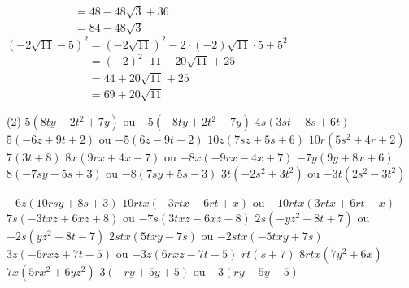 \documentclass[a4paper,12pt]{report}
\begin{document}
\begin{core}
\begin{tasks}
                    $\phantom{\left(4 \sqrt{3} -6\right)^{2}}=48-48\sqrt{3}+36$\\$\phantom{\left(4 \sqrt{3} -6\right)^{2}}={{84-48\sqrt{3}}}$
\task $\left(-2 \sqrt{11} -5\right)^{2}=\left(-2 \sqrt{11} \right)^{2}-2\cdot (-2)\sqrt{11}\cdot 5+5^{2}$\\
                    $\phantom{\left(-2 \sqrt{11} -5\right)^{2}}=(-2)^{2}\cdot 11 +20\sqrt{11}+ 25$\\
                    $\phantom{\left(-2 \sqrt{11} -5\right)^{2}}=44+20\sqrt{11}+25$\\$\phantom{\left(-2 \sqrt{11} -5\right)^{2}}={{69+20\sqrt{11}}}$
\end{tasks}

\end{core}

\begin{core}\phantom{ }

\begin{tasks}(2)
\task $5 (8 t y-2 t^2 + 7 y)$ ou $-5 (-8 t y + 2 t^2-7 y)$
\task $4 s(3 s t + 8 s + 6 t)$
\task $5 (-6 z + 9 t + 2 )$ ou $-5 (6 z-9 t-2 )$
\task $10 z(7 s z + 5 s + 6 )$
\task $10 r(5 s^2 + 4 r + 2 )$
\task $7 (3 t + 8 )$
\task $8 x(9 r x + 4 x-7 )$ ou $-8 x(-9 r x-4 x + 7 )$
\task $-7 y(9 y + 8 x + 6 )$
\task $8 (-7 s y-5 s + 3 )$ ou $-8 (7 s y + 5 s-3 )$
\task $3 t(-2 s^2 + 3 t^2)$ ou $-3 t(2 s^2-3 t^2)$
\end{tasks}

\end{core}

\begin{core}\phantom{ }

\begin{tasks}
\task $-6 z(10 r s y + 8 s + 3 )$
\task $10 r t x(-3 r t x-6 r t + x)$ ou $-10 r t x(3 r t x + 6 r t-x)$
\task $7 s(-3 t x z + 6 x z + 8 )$ ou $-7 s(3 t x z-6 x z-8 )$
\task $2 s(-y z^2-8 t + 7 )$ ou $-2 s(y z^2 + 8 t-7 )$
\task $2 s t x(5 t x y-7 s)$ ou $-2 s t x(-5 t x y + 7 s)$
\task $3 z(-6 r x z + 7 t-5 )$ ou $-3 z(6 r x z-7 t + 5 )$
\task $r t(s + 7 )$
\task $8 r t x(7 y^2 + 6 x)$
\task $7 x(5 r x^2 + 6 y z^2)$
\task $3 (-r y + 5 y + 5 )$ ou $-3 (r y-5 y-5 )$
\end{tasks}

\end{core}
\end{document}
